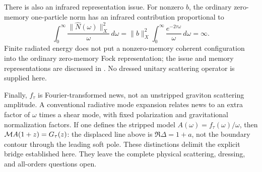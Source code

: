 There is also an infrared representation issue. For nonzero $b$,
the ordinary zero-memory one-particle norm has an infrared contribution
proportional to
\[
 \int_0^\infty\frac{\|\widehat N(\omega)\|_X^2}{\omega}\,d\omega
 =\|b\|_X^2\int_0^\infty\frac{e^{-2\tau\omega}}{\omega}\,d\omega
 =\infty.
\]
Finite radiated energy does not put a nonzero-memory coherent
configuration into the ordinary zero-memory Fock representation;
the issue and memory representations are discussed in \cite{irfock}.
No dressed unitary scattering operator is supplied here.

Finally, $f_\tau$ is Fourier-transformed news, not an unstripped
graviton scattering amplitude. A conventional radiative mode expansion
relates news to an extra factor of $\omega$ times a shear mode, with
fixed polarization and gravitational normalization factors. If one
defines the stripped model $A(\omega)=f_\tau(\omega)/\omega$,
then $\mathcal M A(1+z)=G_\tau(z)$: the displaced line above is
$\Re\Delta=1+a$, not the boundary contour through the leading
soft pole. These distinctions delimit the explicit bridge established
here. They leave the complete physical scattering, dressing, and
all-orders questions open.
